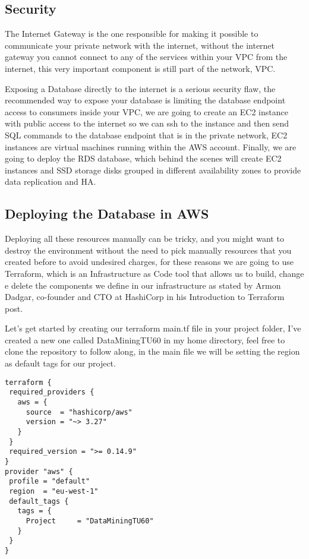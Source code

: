 \documentclass{article}
\begin{document}
\subsection{Security}

The Internet Gateway is the one responsible for making it possible to communicate your private network with the internet, without the internet gateway you cannot connect to any of the services within your VPC from the internet,  this very important component is still part of the network, VPC. 

Exposing a Database directly to the internet is a serious security flaw, the recommended way to expose your database is limiting the database endpoint access to consumers inside your VPC, we are going to create an EC2 instance with public access to the internet so we can ssh to the instance and then send SQL commands to the database endpoint that is in the private network, EC2 instances are virtual machines running within the AWS account.
Finally, we are going to deploy the RDS database, which behind the scenes will create EC2 instances and SSD storage disks grouped in different availability zones to provide data replication and HA. 


\subsection{Deploying the Database in AWS}

Deploying all these resources manually can be tricky, and you might want to destroy the environment without the need to pick manually resources that you created before to avoid undesired charges, for these reasons we are going to use Terraform, which is an Infrastructure as Code tool that allows us to build, change e delete the components we define in our infrastructure as stated by Armon Dadgar, co-founder and CTO at HashiCorp in his Introduction to Terraform post.  

Let's get started by creating our terraform main.tf file in your project folder, I’ve created a new one called DataMiningTU60 in my home directory, feel free to clone the repository to follow along, in the main file we will be setting the region as default tags for our project. 

\begin{lstlisting}[caption=Terraform main file]
terraform {
 required_providers {
   aws = {
     source  = "hashicorp/aws"
     version = "~> 3.27"
   }
 }
 required_version = ">= 0.14.9"
}
provider "aws" {
 profile = "default"
 region  = "eu-west-1"
 default_tags {
   tags = {
     Project     = "DataMiningTU60"
   }
 }
}

\end{lstlisting}
\end{document}
